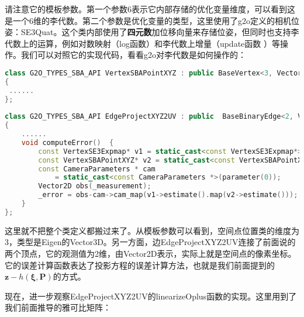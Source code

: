 请注意它的模板参数。第一个参数6表示它内部存储的优化变量维度，可以看到这是一个6维的李代数。第二个参数是优化变量的类型，这里使用了g2o定义的相机位姿：SE3Quat。这个类内部使用了\textbf{四元数}加位移向量来存储位姿，但同时也支持李代数上的运算，例如对数映射（log函数）和李代数上增量（update函数 ）等操作。我们可以对照它的实现代码，看看g2o对李代数是如何操作的：

\begin{lstlisting}[language=c++]
class G2O_TYPES_SBA_API VertexSBAPointXYZ : public BaseVertex<3, Vector3D>
{
 ......
};
 
class G2O_TYPES_SBA_API EdgeProjectXYZ2UV : public  BaseBinaryEdge<2, Vector2D, VertexSBAPointXYZ, VertexSE3Expmap>
{
	......
    void computeError()  {
	    const VertexSE3Expmap* v1 = static_cast<const VertexSE3Expmap*>(_vertices[1]);
	    const VertexSBAPointXYZ* v2 = static_cast<const VertexSBAPointXYZ*>(_vertices[0]);
	    const CameraParameters * cam
		    = static_cast<const CameraParameters *>(parameter(0));
	    Vector2D obs(_measurement);
	    _error = obs-cam->cam_map(v1->estimate().map(v2->estimate()));
    }
};
\end{lstlisting}

这里就不把整个类定义都搬过来了。从模板参数可以看到，空间点位置类的维度为3，类型是Eigen的Vector3D。另一方面，边EdgeProjectXYZ2UV连接了前面说的两个顶点，它的观测值为2维，由Vector2D表示，实际上就是空间点的像素坐标。它的误差计算函数表达了投影方程的误差计算方法，也就是我们前面提到的$\bm{z} - h(\bm{\xi}, \bm{P})$的方式。

现在，进一步观察EdgeProjectXYZ2UV的linearizeOplus函数的实现。这里用到了我们前面推导的雅可比矩阵：

